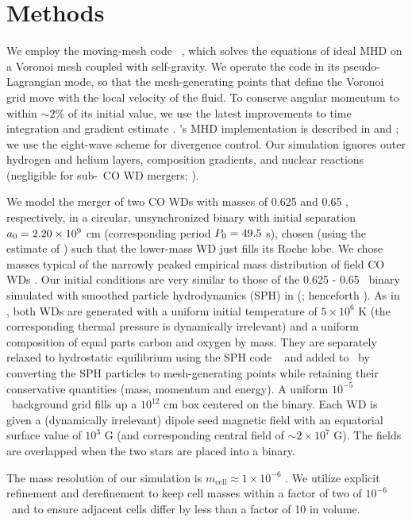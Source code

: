 \section{Methods} 
\label{sec:c4_codes}

We employ the moving-mesh code \arepo\ \citep{spri10}, which solves the equations of ideal MHD on a Voronoi mesh coupled with self-gravity.  We operate the code in its pseudo-Lagrangian mode, so that the mesh-generating points that define the Voronoi grid move with the local velocity of the fluid.  To conserve angular momentum to within $\sim2$\% of its initial value, we use the latest improvements to time integration and gradient estimate \citep{pakm+16}.  \arepo's MHD implementation is described in \cite{pakmbs11} and \cite{pakms13}; we use the \cite{powe+99} eight-wave scheme for divergence control.  Our simulation ignores outer hydrogen and helium layers, composition gradients, and nuclear reactions (negligible for sub-\Mch\ CO WD mergers; \citealt{loreig09,rask+12}).

We model the merger of two CO WDs with masses of 0.625 and 0.65 \Msun, respectively, in a circular, unsynchronized binary with initial separation $\azero = 2.20\times10^9$ cm (corresponding period $\pzero = 49.5$ s), chosen (using the estimate of \citealt{eggl83}) such that the lower-mass WD just fills its Roche lobe.  We chose masses typical of the narrowly peaked empirical mass distribution of field CO WDs \citep{klei+13}.  Our initial conditions are very similar to those of the 0.625 - 0.65 \Msun\ binary simulated with smoothed particle hydrodynamics (SPH) in \citeauthor{zhu+13} (\citeyear{zhu+13}; henceforth \citeal{zhu+13}).  As in \citeal{zhu+13}, both WDs are generated with a uniform initial temperature of $5\times10^6$ K (the corresponding thermal pressure is dynamically irrelevant) and a uniform composition of equal parts carbon and oxygen by mass.  They are separately relaxed to hydrostatic equilibrium using the SPH code \gasoline\ \citep{wadssq04} and added to \arepo\ by converting the SPH particles to mesh-generating points while retaining their conservative quantities (mass, momentum and energy).  A uniform $10^{-5}$ \gcc\ background grid fills up a $10^{12}$ cm box centered on the binary. Each WD is given a (dynamically irrelevant) dipole seed magnetic field with an equatorial surface value of $10^3$ G (and corresponding central field of $\sim2\times10^7$ G). The fields are overlapped when the two stars are placed into a binary.

The mass resolution of our simulation is $m_\mathrm{cell} \approx 1\times10^{-6}$ \Msun.  We utilize explicit refinement and derefinement \citep{voge+12} to keep cell masses within a factor of two of $10^{-6}$ \Msun\ and to ensure adjacent cells differ by less than a factor of 10 in volume.

